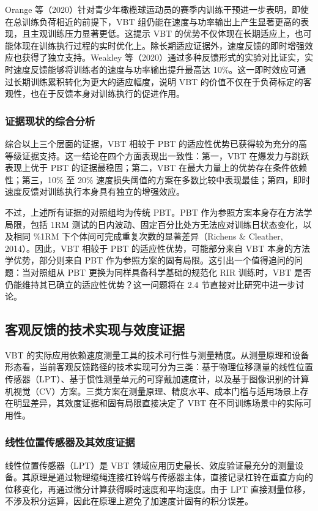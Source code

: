 \documentclass[UTF8,zihao=-4,twoside,openany]{ctexbook}
\begin{document}
Orange 等（2020）针对青少年橄榄球运动员的赛季内训练干预进一步表明，即使在总训练负荷相近的前提下，VBT 组仍能在速度与功率输出上产生显著更高的表现，且主观训练压力显著更低。这提示 VBT 的优势不仅体现在长期适应上，也可能体现在训练执行过程的实时优化上。除长期适应证据外，速度反馈的即时增强效应也获得了独立支持。Weakley 等（2020）通过多种反馈形式的实验对比证实，实时速度反馈能够将训练者的速度与功率输出提升最高达 10\%。这一即时效应可通过长期训练累积转化为更大的适应幅度，说明 VBT 的价值不仅在于负荷标定的客观性，也在于反馈本身对训练执行的促进作用。

\subsubsection{证据现状的综合分析}
综合以上三个层面的证据，VBT 相较于 PBT 的适应性优势已获得较为充分的高等级证据支持。这一结论在四个方面表现出一致性：第一，VBT 在爆发力与跳跃表现上优于 PBT 的证据最稳固；第二，VBT 在最大力量上的优势存在条件依赖性；第三，10\% 至 20\% 速度损失阈值的方案在多数比较中表现最佳；第四，即时速度反馈对训练执行本身具有独立的增强效应。

不过，上述所有证据的对照组均为传统 PBT。PBT 作为参照方案本身存在方法学局限，包括 1RM 测试的日内波动、固定百分比处方无法应对训练日状态变化，以及相同 \%1RM 下个体间可完成重复次数的显著差异（Richens \& Cleather, 2014）。因此，VBT 相较于 PBT 的适应性优势，可能部分来自 VBT 本身的方法学优势，部分则来自 PBT 作为参照方案的固有局限。这引出一个值得追问的问题：当对照组从 PBT 更换为同样具备科学基础的规范化 RIR 训练时，VBT 是否仍能维持其已确立的适应性优势？这一问题将在 2.4 节直接对比研究中进一步讨论。

\subsection{客观反馈的技术实现与效度证据}
VBT 的实际应用依赖速度测量工具的技术可行性与测量精度。从测量原理和设备形态看，当前客观反馈路径的技术实现可分为三类：基于物理位移测量的线性位置传感器（LPT）、基于惯性测量单元的可穿戴加速度计，以及基于图像识别的计算机视觉（CV）方案。三类方案在测量原理、精度水平、成本门槛与适用场景上存在明显差异，其效度证据和固有局限直接决定了 VBT 在不同训练场景中的实际可用性。

\subsubsection{线性位置传感器及其效度证据}
线性位置传感器（LPT）是 VBT 领域应用历史最长、效度验证最充分的测量设备。其原理是通过物理缆绳连接杠铃端与传感器主体，直接记录杠铃在垂直方向的位移变化，再通过微分计算获得瞬时速度和平均速度。由于 LPT 直接测量位移，不涉及积分运算，因此在原理上避免了加速度计固有的积分误差。
\end{document}
